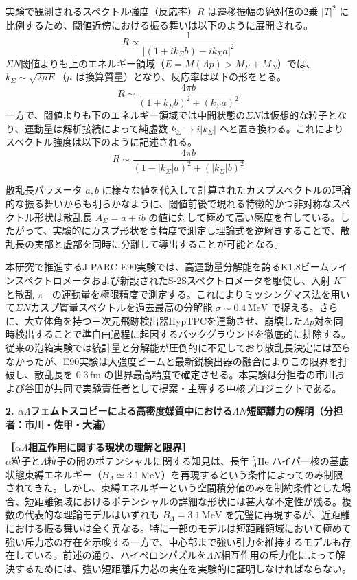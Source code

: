 \documentclass[11pt,a4j,dvipdfmx]{jarticle} 					%
\newcommand{\研究課題名}{加速器実験による短距離バリオン間相互作用の解明と中性子星ハイペロンパズルの解決}
\newcommand{\研究機関名}{東北大学}
\newcommand{\研究代表者氏名}{市川裕大}
\newcommand{\研究期間の最終元号年度}{13}  %
\begin{document}
実験で観測されるスペクトル強度（反応率）$R$ は遷移振幅の絶対値の2乗 $|T|^2$ に比例するため、閾値近傍における振る舞いは以下のように展開される。
\begin{equation}
    R \propto \frac{1}{|(1 + i k_\Sigma b) - i k_\Sigma a|^2}
\end{equation}
$\Sigma N$閾値よりも上のエネルギー領域（$E = M(\Lambda p) > M_\Sigma + M_N$）では、$k_\Sigma \sim \sqrt{2\mu E}$（$\mu$ は換算質量）となり、反応率は以下の形をとる。
\begin{equation}
    R \sim \frac{4\pi b}{(1 + k_\Sigma b)^2 + (k_\Sigma a)^2}
\end{equation}
一方で、閾値よりも下のエネルギー領域では中間状態の$\Sigma N$は仮想的な粒子となり、運動量は解析接続によって純虚数 $k_\Sigma \to i|k_\Sigma|$ へと置き換わる。これによりスペクトル強度は以下のように記述される。
\begin{equation}
    R \sim \frac{4\pi b}{(1 - |k_\Sigma| a)^2 + (|k_\Sigma| b)^2}
\end{equation}

散乱長パラメータ $a, b$ に様々な値を代入して計算されたカスプスペクトルの理論的な振る舞いからも明らかなように、閾値前後で現れる特徴的かつ非対称なスペクトル形状は散乱長 $A_\Sigma = a+ib$ の値に対して極めて高い感度を有している。したがって、実験的にカスプ形状を高精度で測定し理論式を逆解きすることで、散乱長の実部と虚部を同時に分離して導出することが可能となる。

本研究で推進するJ-PARC E90実験では、高運動量分解能を誇るK1.8ビームラインスペクトロメータおよび新設されたS-2Sスペクトロメータを駆使し、入射 $K^-$ と散乱 $\pi^-$ の運動量を極限精度で測定する。これによりミッシングマス法を用いて$\Sigma N$カスプ質量スペクトルを過去最高の分解能 $\sigma \sim 0.4\,\text{MeV}$ で捉える。さらに、大立体角を持つ三次元飛跡検出器HypTPCを連動させ、崩壊した$\Lambda p$対を同時検出することで準自由過程に起因するバックグラウンドを徹底的に排除する。従来の泡箱実験では統計量と分解能が圧倒的に不足しており散乱長決定には至らなかったが、E90実験は大強度ビームと最新鋭検出器の融合によりこの限界を打破し、散乱長を $0.3\,\text{fm}$ の世界最高精度で確定させる。本実験は分担者の市川および谷田が共同で実験責任者として提案・主導する中核プロジェクトである。

\vspace*{1zw}
\noindent
\textbf{2. $\alpha\Lambda$フェムトスコピーによる高密度媒質中における$\Lambda N$短距離力の解明（分担者：市川・佐甲・大浦）}

\noindent
\textbf{［$\alpha\Lambda$相互作用に関する現状の理解と限界］}\\
$\alpha$粒子と$\Lambda$粒子の間のポテンシャルに関する知見は、長年 ${}^5_\Lambda\mathrm{He}$ ハイパー核の基底状態束縛エネルギー（$B_\Lambda \simeq 3.1\,\text{MeV}$）を再現するという条件によってのみ制限されてきた。しかし、束縛エネルギーという空間積分値のみを制約条件とした場合、短距離領域におけるポテンシャルの詳細な形状には甚大な不定性が残る。複数の代表的な理論モデルはいずれも $B_\Lambda = 3.1\,\text{MeV}$ を完璧に再現するが、近距離における振る舞いは全く異なる。特に一部のモデルは短距離領域において極めて強い斥力芯の存在を示唆する一方で、中心部まで強い引力を維持するモデルも存在している。前述の通り、ハイペロンパズルを$\Lambda N$相互作用の斥力化によって解決するためには、強い短距離斥力芯の実在を実験的に証明しなければならない。
\end{document}
